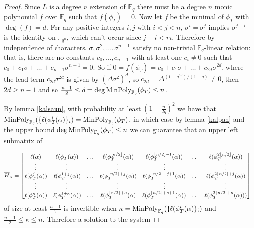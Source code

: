 \documentclass{jams-l}
\theoremstyle{remark}
\numberwithin{equation}{section}
\newcommand{\minpol}{\textnormal{MinPoly}_{\mathbb{F}_q}}
\DeclarePairedDelimiter\floor{\lfloor}{\rfloor}
\begin{document}
\begin{proof}
Since $L$ is a degree $n$ extension of $\mathbb{F}_q$ there must be a degree $n$ monic polynomial $f$ over $\mathbb{F}_q$ such that $f(\phi_T) = 0$. Now let $f$ be the minimal of $\phi_T$ with $\deg(f) = d$. For any positive integers $i,j$ with $i < j < n$, $ \sigma^i = \sigma^j$ implies $\sigma^{j-i}$ is the identity on $\mathbb{F}_{q^n}$, which can't occur since $j - i < m$. Therefore by independence of characters, $\sigma, \sigma^2, \ldots, \sigma^{n-1}$ satisfy no non-trivial $\mathbb{F}_q$-linear relation; that is, there are no constants $c_0, \ldots, c_{n-1}$ with at least one $c_i \neq 0$ such that $c_0 + c_1 \sigma + \ldots + c_{n-1}\sigma^{n-1} = 0$. So if $ 0 = f(\phi_T) = c_0 + c_1 \sigma + \ldots + c_{2d} \sigma^{2d}$, where the lead term $c_{2d} \sigma^{2d}$ is given by $(\Delta \sigma^2)^d$, so $c_{2d} = \Delta^{(1-q^{2d})/(1-q)} \neq 0$, then $2d \geq n-1$ and so $\frac{n-1}{2} \leq d = \deg \minpol(\phi_T) \leq n$.

By lemma \ref{kalsaun}, with probability at least $(1 - \frac{n}{2q})^2$ we have that $\minpol(\{\ell(\phi_T^i(\alpha)\}_i) = \minpol(\phi_T)$, in which case by lemma \ref{kalpan} and the upper bound $\deg \minpol(\phi_T) \leq n$  we can guarantee that an upper left submatrix of

\[\overline{H}_{\kappa} = \begin{bmatrix}\ell(\alpha) & \ell(\phi_T(\alpha)) & \ldots & \ell(\phi_T^{\floor*{n/2}}(\alpha)) & \ell(\phi_T^{\floor*{n/2} + 1}(\alpha)) & \ldots & \ell(\phi_T^{2\floor{n/2}}(\alpha))

\\ \vdots & \vdots & & \vdots & \vdots & & \vdots \\ 

\ell(\phi_T^{j}(\alpha)) & \ell(\phi_T^{1+j}(\alpha)) & \ldots & \ell(\phi_T^{\floor*{n/2}+j}(\alpha)) & \ell(\phi_T^{\floor*{n/2} +j + 1}(\alpha)) & \ldots & \ell(\phi_T^{2\floor{n/2} + j}(\alpha))

\\ \vdots & \vdots & & \vdots & \vdots & & \vdots \\

\ell(\phi_T^{\kappa}(\alpha)) & \ell(\phi_T^{1 + \kappa }(\alpha)) & \ldots & \ell(\phi_T^{\floor*{n/2} + \kappa}(\alpha) & \ell(\phi_T^{\floor*{n/2} + \kappa + 1}(\alpha)) & \ldots & \ell(\phi_T^{2\floor{n/2} + \kappa}(\alpha)))

\end{bmatrix} \]
\noindent of size at least $\frac{n-1}{2}$ is invertible when $\kappa = \minpol(\{\ell(\phi_T^i(\alpha)\}_i)$ and $\frac{n-1}{2} \leq \kappa \leq n$. Therefore a solution to the system


\end{proof}
\end{document}
